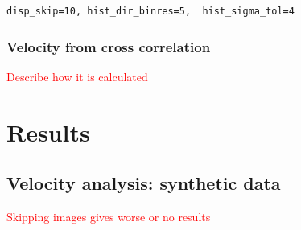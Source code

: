 \documentclass[amtd, manuscript]{copernicus}
\begin{document}
\begin{Verbatim}
disp_skip=10, hist_dir_binres=5,  hist_sigma_tol=4
\end{Verbatim}

\subsubsection{Velocity from cross correlation}
\textcolor{red}{Describe how it is calculated}


\section{Results}
\subsection{Velocity analysis: synthetic data}
\textcolor{red}{Skipping images gives worse or no results
}
\end{document}
